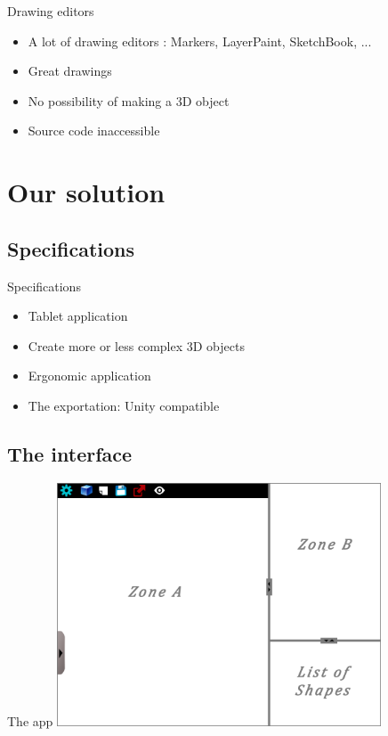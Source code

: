 \documentclass[a4paper,10pt]{beamer}
\begin{document}
			\begin{frame}{Drawing editors}
				\begin{itemize}
					\item A lot of drawing editors : Markers, LayerPaint, SketchBook, ...
					\item Great drawings
					\item No possibility of making a 3D object
					\item Source code inaccessible
				\end{itemize}
			\end{frame}
	
	\section{Our solution}
		\subsection{Specifications}
		
		\begin{frame}{Specifications}
			\begin{itemize}
				\item Tablet application
				\item Create more or less complex 3D objects
				\item Ergonomic application
				\item The exportation: Unity compatible
			\end{itemize}
		\end{frame}
		
		\subsection{The interface}
		
			\begin{frame}{The app}
				\includegraphics[height=205pt]{maquette/maquette_1.png}
			\end{frame}
			
\end{document}
